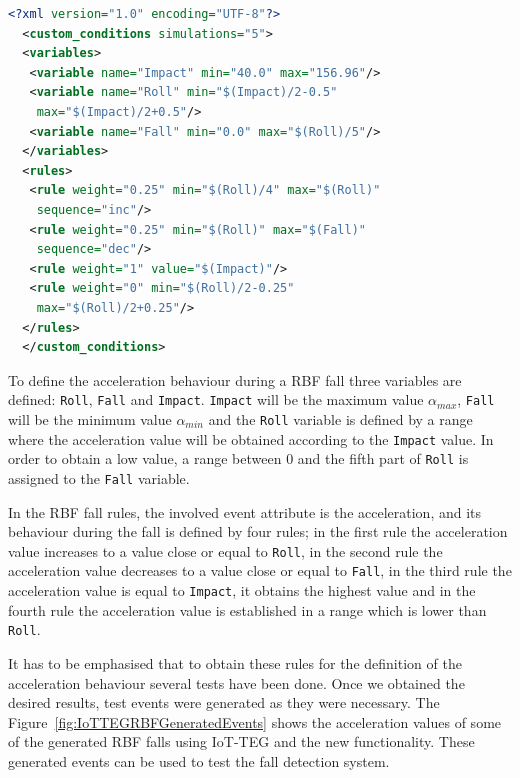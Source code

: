 \documentclass[journal]{IEEEtran}
\begin{document}
\begin{lstlisting}[basicstyle=\ttfamily\scriptsize,language=XML,caption={Rules to define a RBF fall},label=RBFFallRules]
  <?xml version="1.0" encoding="UTF-8"?>
  <custom_conditions simulations="5">
  <variables>
   <variable name="Impact" min="40.0" max="156.96"/>
   <variable name="Roll" min="$(Impact)/2-0.5" 
    max="$(Impact)/2+0.5"/>
   <variable name="Fall" min="0.0" max="$(Roll)/5"/>
  </variables>
  <rules>
   <rule weight="0.25" min="$(Roll)/4" max="$(Roll)" 
    sequence="inc"/>
   <rule weight="0.25" min="$(Roll)" max="$(Fall)" 
    sequence="dec"/>
   <rule weight="1" value="$(Impact)"/>
   <rule weight="0" min="$(Roll)/2-0.25" 
    max="$(Roll)/2+0.25"/>
  </rules>
  </custom_conditions>
\end{lstlisting}

To define the acceleration behaviour during a RBF fall three variables are defined: \texttt{\small{Roll}}, 
\texttt{\small{Fall}} and \texttt{\small{Impact}}. \texttt{\small{Impact}} will be the maximum value $\alpha_{max}$, 
\texttt{\small{Fall}} will be the minimum value $\alpha_{min}$ and the \texttt{\small{Roll}} variable is defined by a 
range where the acceleration value will be obtained according to the \texttt{\small{Impact}} value. In order to
obtain a low value, a range between 0 and the fifth part of \texttt{\small{Roll}} is assigned to the \texttt{\small{Fall}} 
variable.

In the RBF fall rules, the involved event attribute is the acceleration, and its behaviour during the 
fall is defined by four rules; in the first rule the acceleration value increases to a value close or equal to \texttt{\small{Roll}},
in the second rule the acceleration value decreases to a value close or equal to \texttt{\small{Fall}}, in the third rule the 
acceleration value is equal to \texttt{\small{Impact}}, it obtains the highest value and in the fourth rule the acceleration value
is established in a range which is lower than \texttt{\small{Roll}}.

It has to be emphasised that to obtain these rules for the definition
of the acceleration behaviour several tests
have been done. Once we obtained the desired results, test events were generated as they were necessary. The 
Figure~\ref{fig:IoTTEGRBFGeneratedEvents} shows the acceleration values of some of the generated RBF falls using
IoT-TEG and the new functionality. These generated events can be used to test the fall detection system.
\end{document}
